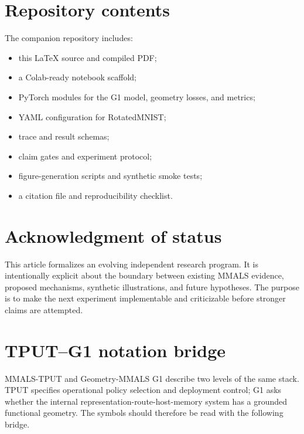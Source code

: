 \documentclass[11pt,a4paper]{article}
\begin{document}
\section*{Repository contents}

The companion repository includes:

\begin{itemize}
\item this LaTeX source and compiled PDF;
\item a Colab-ready notebook scaffold;
\item PyTorch modules for the G1 model, geometry losses, and metrics;
\item YAML configuration for RotatedMNIST;
\item trace and result schemas;
\item claim gates and experiment protocol;
\item figure-generation scripts and synthetic smoke tests;
\item a citation file and reproducibility checklist.
\end{itemize}

\section*{Acknowledgment of status}

This article formalizes an evolving independent research program. It is intentionally explicit about the boundary between existing MMALS evidence, proposed mechanisms, synthetic illustrations, and future hypotheses. The purpose is to make the next experiment implementable and criticizable before stronger claims are attempted.




\appendix

\section{TPUT--G1 notation bridge}

MMALS-TPUT and Geometry-MMALS G1 describe two levels of the same stack. TPUT specifies operational policy selection and deployment control; G1 asks whether the internal representation-route-host-memory system has a grounded functional geometry. The symbols should therefore be read with the following bridge.
\end{document}
